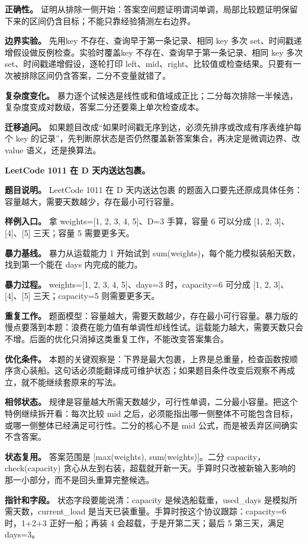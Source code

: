 \textbf{正确性。} 证明从排除一侧开始：答案空间题证明谓词单调，局部比较题证明保留下来的区间仍含目标；不能只靠经验猜测左右边界。

\textbf{边界实验。} 先用key 不存在、查询早于第一条记录、相同 key 多次 set、时间戳递增假设做反例检查。实验时覆盖key 不存在、查询早于第一条记录、相同 key 多次 set、时间戳递增假设，逐轮打印 left、mid、right、比较值或检查结果。只要有一次被排除区间仍含答案，二分不变量就错了。

\textbf{复杂度变化。} 暴力逐个试候选是线性或和值域成正比；二分每次排除一半候选，复杂度变成对数级，答案二分还要乘上单次检查成本。

\textbf{迁移追问。} 如果题目改成“如果时间戳无序到达，必须先排序或改成有序表维护每个 key 的记录”，先判断原状态是否仍然覆盖新答案集合，再决定是微调边界、改 value 语义，还是换算法。

\noindent\textbf{LeetCode 1011 在 D 天内送达包裹。}

\textbf{题目说明。} LeetCode 1011 在 D 天内送达包裹 的题面入口要先还原成具体任务：容量越大，需要天数越少，存在最小可行容量。

\textbf{样例入口。} 拿 weights=[1, 2, 3, 4, 5]、D=3 手算，容量 6 可以分成 [1, 2, 3]、[4]、[5] 三天；容量 5 需要更多天。

\textbf{暴力基线。} 暴力从运载能力 1 开始试到 sum(weights)，每个能力模拟装船天数，找到第一个能在 days 内完成的能力。

\textbf{暴力过程。} weights=[1, 2, 3, 4, 5]、days=3 时，capacity=6 可分成 [1, 2, 3]、[4]、[5] 三天；capacity=5 则需要更多天。

\textbf{重复工作。} 题面模型：容量越大，需要天数越少，存在最小可行容量。暴力版的慢点要落到本题：浪费在能力值有单调性却线性试。运载能力越大，需要天数只会不增。后面的优化只消掉这类重复工作，不能改变答案集合。

\textbf{优化条件。} 本题的关键观察是：下界是最大包裹，上界是总重量，检查函数按顺序贪心装船。这句话必须能翻译成可维护状态；如果题目条件改变后观察不再成立，就不能继续套原来的写法。

\textbf{相邻状态。} 规律是容量越大所需天数越少，可行性单调，二分最小容量。把这个特例继续拆开看：每次比较 mid 之后，必须能指出哪一侧整体不可能包含目标，或哪一侧整体已经满足可行性。二分的核心不是 mid 公式，而是被丢弃区间确实不含答案。

\textbf{状态复用。} 答案范围是 [max(weights), sum(weights)]。二分 capacity，check(capacity) 贪心从左到右装，超载就开新一天。手算时只改被新输入影响的那一小部分，而不是回头重算完整候选。

\textbf{指针和字段。} 状态字段要能说清：capacity 是候选船载重，used\_days 是模拟所需天数，current\_load 是当天已装重量。手算时按这个协议跟踪：capacity=6 时，1+2+3 正好一船；再装 4 会超载，于是开第二天；最后 5 第三天，满足 days=3。

